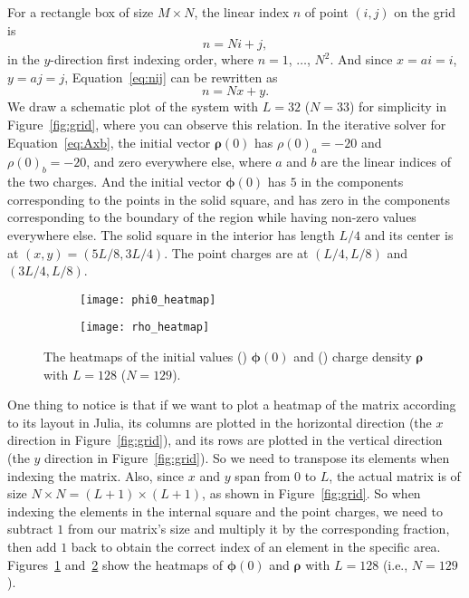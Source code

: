 For a rectangle box of size \(M \times N\), the linear index \(n\) of point \((i, j)\)
on the grid is
%
\begin{equation}\label{eq:nij}
    n = N i + j,
\end{equation}
%
in the \(y\)-direction first indexing order, where \(n = 1\), \(\ldots\), \(N^2\).
And since \(x = a i = i\), \(y = a j = j\), Equation~\eqref{eq:nij} can be rewritten as
%
\begin{equation}
    n = N x + y.
\end{equation}
%
We draw a schematic plot of the system with \(L = 32\) (\(N = 33\)) for simplicity in
Figure~\ref{fig:grid}, where you can observe this relation.
In the iterative solver for Equation~\eqref{eq:Axb},
the initial vector \(\bm{\rho}(0)\) has \(\rho(0)_a = -20\) and \(\rho(0)_b = -20\),
and zero everywhere else,
where \(a\) and \(b\) are the linear indices of the two charges.
And the initial vector \(\bm{\phi}(0)\) has \(5\) in the components corresponding to
the points in the solid square, and has zero in the components corresponding to
the boundary of the region while having non-zero values everywhere else.
The solid square in the interior has length \(L/4\) and
its center is at \((x, y) = (5L/8, 3L/4)\).
The point charges are at \((L/4, L/8)\) and \((3L/4, L/8)\).

\begin{figure}[!hbt]
    \centering
    \begin{subfigure}[t]{0.49\linewidth}
        \centering
        \texttt{[image: phi0\_heatmap]}
        \caption{\label{fig:t0:a}}
    \end{subfigure}
    \hfill
    \begin{subfigure}[t]{0.49\linewidth}
        \centering
        \texttt{[image: rho\_heatmap]}
        \caption{\label{fig:t0:b}}
    \end{subfigure}
    \caption{The heatmaps of the initial values (\protect{}) \(\bm{\phi}(0)\)
        and (\protect{}) charge density \(\bm{\rho}\)
        with \(L = 128\) (\(N = 129\)).}
    \label{fig:status}
\end{figure}

One thing to notice is that if we want to plot a heatmap of
the matrix according to its layout in Julia, its columns are plotted in the
horizontal direction (the \(x\) direction in Figure~\ref{fig:grid}),
and its rows are plotted in the vertical direction
(the \(y\) direction in Figure~\ref{fig:grid}).
So we need to transpose its elements when indexing the matrix.
Also, since \(x\) and \(y\) span from \(0\) to \(L\), the actual matrix is of size
\(N \times N = (L + 1) \times (L + 1)\), as shown in Figure~\ref{fig:grid}.
So when indexing the elements in the internal square and the point charges,
we need to subtract \(1\) from our matrix's size and multiply it by the corresponding
fraction, then add \(1\) back to obtain the correct index of an element in the
specific area.
Figures~\ref{fig:t0:a} and~\ref{fig:t0:b} show the heatmaps of
\(\bm{\phi}(0)\) and \(\bm{\rho}\) with \(L = 128\) (i.e., \(N = 129\)).

